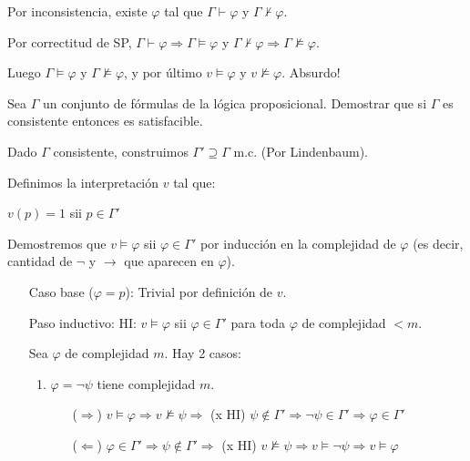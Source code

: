\begin{questions}
\begin{solution}
Por inconsistencia, existe $\varphi$ tal que $\Gamma \vdash \varphi$ y $\Gamma \nvdash \varphi$.

Por correctitud de SP, $\Gamma\vdash\varphi \Rightarrow \Gamma\vDash\varphi$ y $\Gamma\nvdash\varphi\Rightarrow \Gamma\nvDash\varphi$. 

Luego $\Gamma\vDash\varphi$ y $\Gamma\nvDash\varphi$, y por \'ultimo $v \vDash \varphi$ y $v \nvDash \varphi$. Absurdo!

\end{solution}

\question Sea $\Gamma$ un conjunto de f\'ormulas de la l\'ogica proposicional. Demostrar que si $\Gamma$ es consistente entonces es satisfacible. 


\begin{solution}
 
 Dado $\Gamma$ consistente, construimos $\Gamma'\supseteq\Gamma$ m.c. (Por Lindenbaum).
 
 Definimos la interpretaci\'on $v$ tal que: 
 
 \begin{center}
  $v(p) = 1$ sii $p\in\Gamma'$
 \end{center}
 
 Demostremos que $v\vDash\varphi$ sii $\varphi\in\Gamma'$ por inducci\'on en la complejidad de $\varphi$ (es decir, cantidad de $\neg$ y $\rightarrow$ que aparecen en $\varphi$).

 \begin{enumerate}[\quad]
  \item[Caso base ($\varphi=p$):] Trivial por definici\'on de $v$. 

  \item[Paso inductivo:] HI: $v\vDash\varphi$ sii $\varphi\in\Gamma'$ para toda $\varphi$ de complejidad $<m$.
  
  Sea $\varphi$ de complejidad $m$. Hay 2 casos: 
  
  \begin{enumerate}
    \item $\varphi=\neg\psi$ tiene complejidad $m$. 
    
    \begin{itemize}
    \item[($\Rightarrow$)] $v\vDash\varphi \Rightarrow v \nvDash \psi \Rightarrow$ (x HI) $\psi\notin\Gamma' \Rightarrow \neg\psi\in\Gamma' \Rightarrow \varphi\in\Gamma'$
    \item[($\Leftarrow$)] $\varphi\in\Gamma' \Rightarrow \psi\notin\Gamma' \Rightarrow$ (x HI) $v\nvDash\psi \Rightarrow v\vDash\neg\psi \Rightarrow v\vDash\varphi$
    \end{itemize}


\end{enumerate}
\end{enumerate}
\end{solution}
\end{questions}
